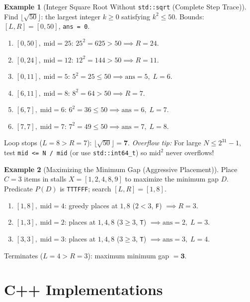 \documentclass[11pt,a4paper]{article}
\theoremstyle{definition}
\newtheorem{example}{Example}[section]
\begin{document}
\begin{example}[Integer Square Root Without \texttt{std::sqrt} (Complete Step Trace)]
Find $\lfloor \sqrt{50} \rfloor$: the largest integer $k \ge 0$ satisfying $k^2 \le 50$. Bounds: $[L, R] = [0, 50]$, \texttt{ans = 0}.
\begin{enumerate}
    \item $[0, 50],\; \text{mid} = 25$: $25^2 = 625 > 50 \implies R = 24$.
    \item $[0, 24],\; \text{mid} = 12$: $12^2 = 144 > 50 \implies R = 11$.
    \item $[0, 11],\; \text{mid} = 5$: $5^2 = 25 \le 50 \implies \text{ans} = 5,\; L = 6$.
    \item $[6, 11],\; \text{mid} = 8$: $8^2 = 64 > 50 \implies R = 7$.
    \item $[6, 7],\; \text{mid} = 6$: $6^2 = 36 \le 50 \implies \text{ans} = 6,\; L = 7$.
    \item $[7, 7],\; \text{mid} = 7$: $7^2 = 49 \le 50 \implies \text{ans} = 7,\; L = 8$.
\end{enumerate}
Loop stops ($L = 8 > R = 7$): $\lfloor \sqrt{50} \rfloor = \mathbf{7}$. \emph{Overflow tip:} For large $N \le 2^{31} - 1$, test \texttt{mid <= N / mid} (or use \texttt{std::int64\_t}) so $\text{mid}^2$ never overflows!
\end{example}

\begin{example}[Maximizing the Minimum Gap (Aggressive Placement)]
Place $C = 3$ items in stalls $X = [1, 2, 4, 8, 9]$ to maximize the minimum gap $D$. Predicate $P(D)$ is \texttt{TTTFFF}; search $[L, R] = [1, 8]$.
\begin{enumerate}
    \item $[1, 8],\; \text{mid} = 4$: greedy places at $1, 8$ ($2 < 3$, \texttt{F}) $\implies R = 3$.
    \item $[1, 3],\; \text{mid} = 2$: places at $1, 4, 8$ ($3 \ge 3$, \texttt{T}) $\implies \text{ans} = 2,\; L = 3$.
    \item $[3, 3],\; \text{mid} = 3$: places at $1, 4, 8$ ($3 \ge 3$, \texttt{T}) $\implies \text{ans} = 3,\; L = 4$.
\end{enumerate}
Terminates ($L = 4 > R = 3$): maximum minimum gap $= \mathbf{3}$.
\end{example}

\section{C++ Implementations}
\end{document}
